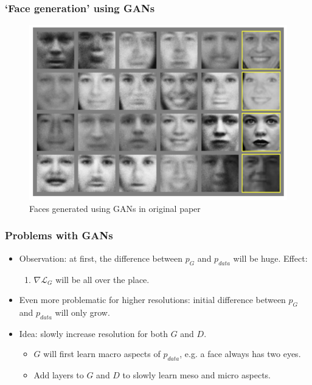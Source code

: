 \documentclass[xcolor=dvipsnames]{beamer}
\begin{document}
\begin{frame}
\frametitle{`Face generation' using GANs}
\begin{figure}
	\includegraphics[width=\linewidth]{img/GAN_faces.png}
	\caption{Faces generated using GANs in original paper\cite{goodfellow2014generative}}
\end{figure}
\end{frame}



\begin{frame}
\frametitle{Problems with GANs}
\begin{itemize}
	\item Observation: at first, the difference between $p_G$ and $p_{data}$ will be huge. Effect:
	\begin{enumerate}[]
		\item $\nabla \mathcal{L}_G$ will be all over the place.
	\end{enumerate}
	\item Even more problematic for higher resolutions: initial difference between $p_G$ and $p_{data}$ will only grow.
	\item Idea: slowly increase resolution for both $G$ and $D$.
	\begin{itemize}
		\item $G$ will first learn macro aspects of $p_{data}$, e.g. a face always has two eyes.
		\item Add layers to $G$ and $D$ to slowly learn meso and micro aspects.
	\end{itemize}
\end{itemize}
\end{frame}
\end{document}
